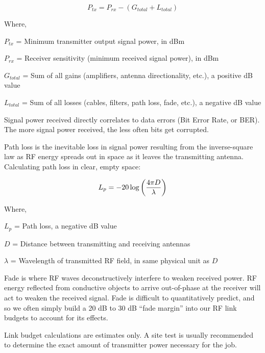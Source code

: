 $$P_{tx} = P_{rx} - (G_{total} + L_{total})$$

\noindent
Where,

$P_{tx}$ = Minimum transmitter output signal power, in dBm

$P_{rx}$ = Receiver sensitivity (minimum received signal power), in dBm

$G_{total}$ = Sum of all gains (amplifiers, antenna directionality, etc.), a positive dB value

$L_{total}$ = Sum of all losses (cables, filters, path loss, fade, etc.), a negative dB value

\vskip 10pt

Signal power received directly correlates to data errors (Bit Error Rate, or BER).  The more signal power received, the less often bits get corrupted.

\vskip 10pt

Path loss is the inevitable loss in signal power resulting from the inverse-square law as RF energy spreads out in space as it leaves the transmitting antenna.  Calculating path loss in clear, empty space:

$$L_p = -20 \log \left(4 \pi D \over \lambda\right)$$

\noindent
Where,

$L_p$ = Path loss, a negative dB value

$D$ = Distance between transmitting and receiving antennas

$\lambda$ = Wavelength of transmitted RF field, in same physical unit as $D$

\vskip 10pt

Fade is where RF waves deconstructively interfere to weaken received power.  RF energy reflected from conductive objects to arrive out-of-phase at the receiver will act to weaken the received signal.  Fade is difficult to quantitatively predict, and so we often simply build a 20 dB to 30 dB ``fade margin'' into our RF link budgets to account for its effects.

\vskip 10pt

Link budget calculations are estimates only.  A site test is usually recommended to determine the exact amount of transmitter power necessary for the job.










\vskip 10pt

\filbreak

